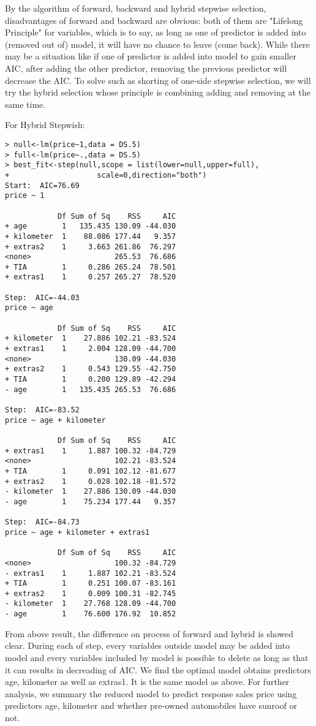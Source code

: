 \documentclass[a4paper]{article}
\begin{document}
\noindent
By the algorithm of forward, backward and hybrid stepwise selection, disadvantages of forward and backward are obvious: both of them are "Lifelong Principle" for variables, which is to say, as long as one of predictor is added into (removed out of) model, it will have no chance to leave (come back). While there may be a situation like if one of predictor is added into model to gain smaller AIC, after adding the other predictor, removing the previous predictor will decrease the AIC. To solve such as shorting of one-side stepwise selection, we will try the hybrid selection whose principle is combining adding and removing at the same time. 



\noindent
For Hybrid Stepwish:


\begin{verbatim}
> null<-lm(price~1,data = DS.5)
> full<-lm(price~.,data = DS.5)
> best_fit<-step(null,scope = list(lower=null,upper=full),
+                    scale=0,direction="both")
Start:  AIC=76.69
price ~ 1

            Df Sum of Sq    RSS     AIC
+ age        1   135.435 130.09 -44.030
+ kilometer  1    88.086 177.44   9.357
+ extras2    1     3.663 261.86  76.297
<none>                   265.53  76.686
+ TIA        1     0.286 265.24  78.501
+ extras1    1     0.257 265.27  78.520

Step:  AIC=-44.03
price ~ age

            Df Sum of Sq    RSS     AIC
+ kilometer  1    27.886 102.21 -83.524
+ extras1    1     2.004 128.09 -44.700
<none>                   130.09 -44.030
+ extras2    1     0.543 129.55 -42.750
+ TIA        1     0.200 129.89 -42.294
- age        1   135.435 265.53  76.686

Step:  AIC=-83.52
price ~ age + kilometer

            Df Sum of Sq    RSS     AIC
+ extras1    1     1.887 100.32 -84.729
<none>                   102.21 -83.524
+ TIA        1     0.091 102.12 -81.677
+ extras2    1     0.028 102.18 -81.572
- kilometer  1    27.886 130.09 -44.030
- age        1    75.234 177.44   9.357

Step:  AIC=-84.73
price ~ age + kilometer + extras1

            Df Sum of Sq    RSS     AIC
<none>                   100.32 -84.729
- extras1    1     1.887 102.21 -83.524
+ TIA        1     0.251 100.07 -83.161
+ extras2    1     0.009 100.31 -82.745
- kilometer  1    27.768 128.09 -44.700
- age        1    76.600 176.92  10.852
\end{verbatim}
From above result, the difference on process of forward and hybrid is showed clear. During each of step, every variables outside model may be added into model and every variables included by model is possible to delete as long as that it can results in decreading of AIC. We find the optimal model obtains predictors age, kilometer as well as extras1. It is the same model as above. For further analysis, we summary the reduced model to predict response sales price using predictors age, kilometer and whether pre-owned automobiles have sunroof or not.\\
\end{document}
